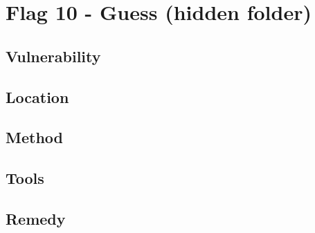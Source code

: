 \section{Flag 10 - Guess (hidden folder)}

\begin{center}
\end{center}

\subsection{Vulnerability}

\subsection{Location}

\subsection{Method}

\subsection{Tools}

\subsection{Remedy}